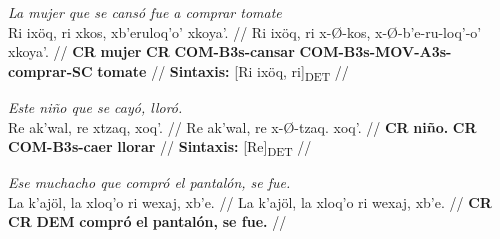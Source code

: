 \documentclass{article}%
\begin{document}
%
\par\medskip%
\ex
\textit{La mujer que se cansó fue a comprar tomate} \\
\begingl
\gla Ri ixöq, ri xkos, xb'eruloq'o' xkoya'. //
\glb Ri ixöq, ri x-Ø-kos, x-Ø-b'e-ru-loq'-o' xkoya'. //
\glc \textbf{CR} \textbf{mujer} \textbf{CR} \textbf{COM-}\textbf{B3s-}\textbf{cansar} \textbf{COM-}\textbf{B3s-}\textbf{MOV-}\textbf{A3s-}\textbf{comprar-}\textbf{SC} \textbf{tomate} //
\glft \textbf{Sintaxis:} [Ri ixöq, ri]\textsubscript{DET} //
\endgl
\xe
%
\medskip%
\par\medskip%
\ex
\textit{Este niño que se cayó, lloró.} \\
\begingl
\gla Re ak'wal, re xtzaq, xoq'. //
\glb Re ak'wal, re x-Ø-tzaq. xoq'. //
\glc \textbf{CR} \textbf{niño.} \textbf{CR} \textbf{COM-}\textbf{B3s-}\textbf{caer} \textbf{llorar} //
\glft \textbf{Sintaxis:} [Re]\textsubscript{DET} //
\endgl
\xe
%
\medskip%
\par\medskip%
\ex
\textit{Ese muchacho que compró el pantalón, se fue.} \\
\begingl
\gla La k'ajöl, la xloq'o ri wexaj, xb'e. //
\glb La k'ajöl, la xloq'o ri wexaj, xb'e. //
\glc \textbf{CR} \textbf{CR} \textbf{DEM} \textbf{compró} \textbf{el} \textbf{pantalón,} \textbf{se fue.} //
\endgl
\xe
%
\medskip

%
\end{document}
